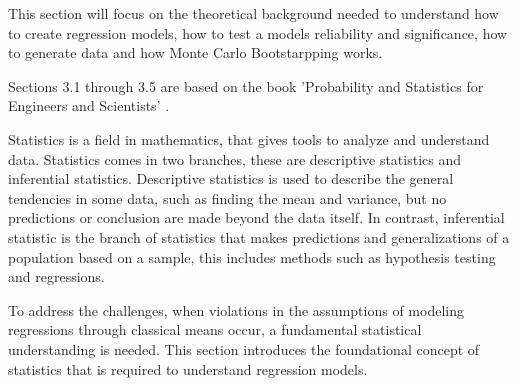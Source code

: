 This section will focus on the theoretical background needed to understand how to create regression models, how to test a models reliability and significance, how to generate data and how Monte Carlo Bootstarpping works.

\noindent Sections 3.1 through 3.5 are based on the book 'Probability and Statistics for Engineers and Scientists' \cite{ProbAndStat}. \newline

\noindent Statistics is a field in mathematics, that gives tools to analyze and understand data. Statistics comes in two branches, these are descriptive statistics and inferential statistics. Descriptive statistics is used to describe the general tendencies in some data, such as finding the mean and variance, but no predictions or conclusion are made beyond the data itself. In contrast, inferential statistic is the branch of statistics that makes predictions and generalizations of a population based on a sample, this includes methods such as hypothesis testing and regressions. 

\noindent To address the challenges, when violations in the assumptions of modeling regressions through classical means occur, a fundamental statistical understanding is needed. This section introduces the foundational concept of statistics that is required to understand regression models.






\newpage

